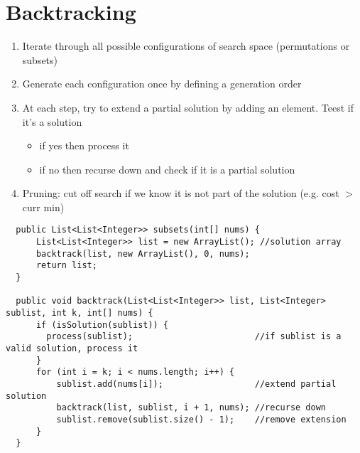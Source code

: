 \documentclass{article}
\begin{document}
  \section{Backtracking}
  \begin{enumerate}[noitemsep]
    \item Iterate through all possible configurations of search space (permutations or subsets)
    \item Generate each configuration once by defining a generation order
    \item At each step, try to extend a partial solution by adding an element. Teest if it's a solution
      \begin{itemize}[noitemsep]
        \item if yes then process it
        \item if no then recurse down and check if it is a partial solution
      \end{itemize}
    \item Pruning: cut off search if we know it is not part of the solution (e.g. cost $>$ curr min)
  \end{enumerate}
  \begin{lstlisting}
  public List<List<Integer>> subsets(int[] nums) {
      List<List<Integer>> list = new ArrayList(); //solution array
      backtrack(list, new ArrayList(), 0, nums);
      return list;
  }
  
  public void backtrack(List<List<Integer>> list, List<Integer> sublist, int k, int[] nums) {
      if (isSolution(sublist)) {
        process(sublist);                        //if sublist is a valid solution, process it
      }
      for (int i = k; i < nums.length; i++) {
          sublist.add(nums[i]);                  //extend partial solution
          backtrack(list, sublist, i + 1, nums); //recurse down
          sublist.remove(sublist.size() - 1);    //remove extension
      }
  }
  \end{lstlisting}
\end{document}
